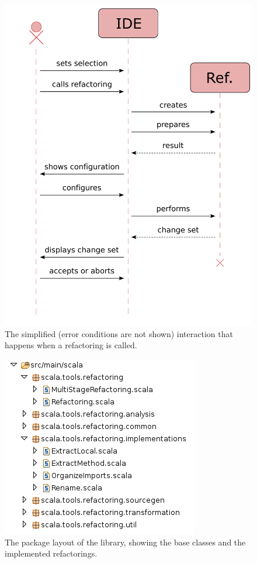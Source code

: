 \documentclass[10pt,a4paper,oneside]{scrreprt}
\begin{document}
\begin{figure}
  \centering
  \includegraphics[width=0.9\linewidth]{refactoring-sequence.pdf}
  \caption{The simplified (error conditions are not shown) interaction that happens when a refactoring is called.}
  \label{figure:refactoring-sequence}
\end{figure}

\begin{figure}
  \centering
  \includegraphics[width=0.5\linewidth]{package-layout.png}
  \caption{The package layout of the library, showing the base classes and the implemented refactorings.}
  \label{figure:package-layout}
\end{figure}
\end{document}
